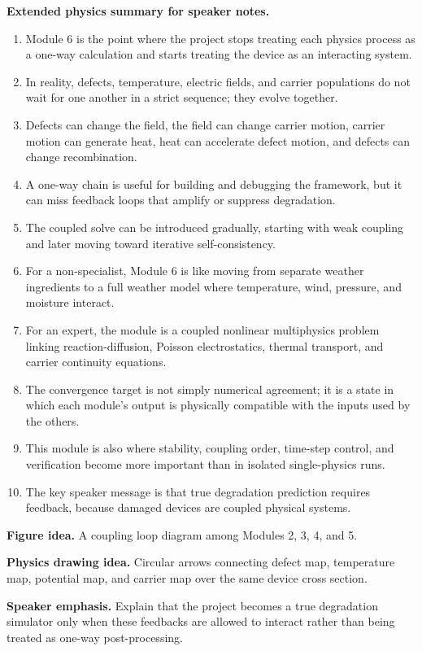 \documentclass[11pt]{article}
\begin{document}
\textbf{Extended physics summary for speaker notes.}
\begin{enumerate}[leftmargin=1.6em]
    \item Module 6 is the point where the project stops treating each physics process as a one-way calculation and starts treating the device as an interacting system.
    \item In reality, defects, temperature, electric fields, and carrier populations do not wait for one another in a strict sequence; they evolve together.
    \item Defects can change the field, the field can change carrier motion, carrier motion can generate heat, heat can accelerate defect motion, and defects can change recombination.
    \item A one-way chain is useful for building and debugging the framework, but it can miss feedback loops that amplify or suppress degradation.
    \item The coupled solve can be introduced gradually, starting with weak coupling and later moving toward iterative self-consistency.
    \item For a non-specialist, Module 6 is like moving from separate weather ingredients to a full weather model where temperature, wind, pressure, and moisture interact.
    \item For an expert, the module is a coupled nonlinear multiphysics problem linking reaction-diffusion, Poisson electrostatics, thermal transport, and carrier continuity equations.
    \item The convergence target is not simply numerical agreement; it is a state in which each module's output is physically compatible with the inputs used by the others.
    \item This module is also where stability, coupling order, time-step control, and verification become more important than in isolated single-physics runs.
    \item The key speaker message is that true degradation prediction requires feedback, because damaged devices are coupled physical systems.
\end{enumerate}

\textbf{Figure idea.} A coupling loop diagram among Modules 2, 3, 4, and 5.

\textbf{Physics drawing idea.} Circular arrows connecting defect map, temperature map, potential map, and carrier map over the same device cross section.

\textbf{Speaker emphasis.} Explain that the project becomes a true degradation simulator only when these feedbacks are allowed to interact rather than being treated as one-way post-processing.
\end{document}
